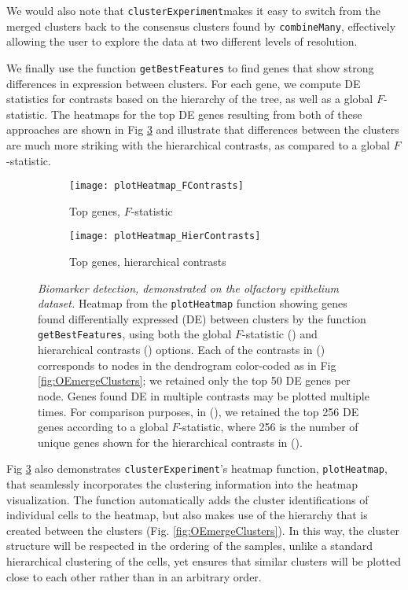\documentclass[10pt,letterpaper]{article}
\newcommand{\f}[1]{\texttt{#1}}
\newcommand{\CE}{\f{clusterExperiment}}
\begin{document}
We would also note that \CE makes it easy to switch from the merged clusters back to the consensus clusters found by \f{combineMany}, effectively allowing the user to explore the data at two different levels of resolution.

We finally use the function \f{getBestFeatures} to find genes that show strong differences in expression between clusters. For each gene, we compute DE statistics for contrasts based on the hierarchy of the tree, as well as a global $F$-statistic. The heatmaps for the top DE genes resulting from both of these approaches are shown in Fig \ref{fig:OEDEgenes} and illustrate that differences between the clusters are much more striking with the hierarchical contrasts, as compared to a global $F$-statistic. 

\begin{figure}
	\centering
	\begin{subfigure}[b]{0.45\textwidth}
	        \texttt{[image: plotHeatmap\_FContrasts]}
	        \caption{Top genes, $F$-statistic}
	        \label{subfig:Fgenes}
	   \end{subfigure}
	\begin{subfigure}[b]{0.45\textwidth}
		\texttt{[image: plotHeatmap\_HierContrasts]}
	        \caption{Top genes, hierarchical contrasts}
	        \label{subfig:hierGenes}
		\end{subfigure}
\caption{{\em Biomarker detection, demonstrated on the olfactory epithelium dataset.}
Heatmap from the \f{plotHeatmap} function showing genes found differentially expressed (DE) between clusters by the function \f{getBestFeatures}, using both the global $F$-statistic (\protect{}) and hierarchical contrasts (\protect{}) options. Each of the contrasts in (\protect{}) corresponds to nodes in the dendrogram color-coded as in Fig \ref{fig:OEmergeClusters}; we retained only the top 50 DE genes per node. Genes found DE in multiple contrasts may be plotted multiple times. For comparison purposes, in (\protect{}), we retained the top 256 DE genes according to a global $F$-statistic, where 256 is the number of unique genes shown for the hierarchical contrasts in (\protect{}). 
\label{fig:OEDEgenes}
}
\end{figure}

Fig \ref{fig:OEDEgenes} also demonstrates \CE's heatmap function, \f{plotHeatmap}, that seamlessly incorporates the clustering information into the heatmap visualization. The function automatically adds the cluster identifications of individual cells to the heatmap, but also makes use of the hierarchy that is created between the clusters (Fig. \ref{fig:OEmergeClusters}). In this way, the cluster structure will be respected in the ordering of the samples, unlike a standard hierarchical clustering of the cells,  yet ensures that similar clusters will be plotted close to each other rather than in an arbitrary order.
\end{document}
